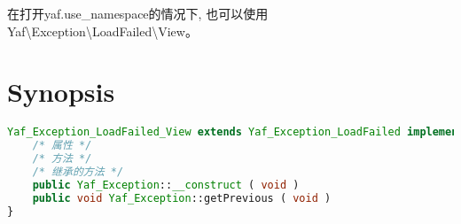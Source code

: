 在打开yaf.use\_namespace的情况下, 也可以使用 Yaf\textbackslash Exception\textbackslash LoadFailed\textbackslash View。

\section{Synopsis}


\begin{lstlisting}[language=PHP]
Yaf_Exception_LoadFailed_View extends Yaf_Exception_LoadFailed implements Throwable {
    /* 属性 */
    /* 方法 */
    /* 继承的方法 */
    public Yaf_Exception::__construct ( void )
    public void Yaf_Exception::getPrevious ( void )
}
\end{lstlisting}

\begin{lstlisting}[language=PHP]

\end{lstlisting}




\begin{lstlisting}[language=PHP]

\end{lstlisting}



\begin{lstlisting}[language=PHP]

\end{lstlisting}


